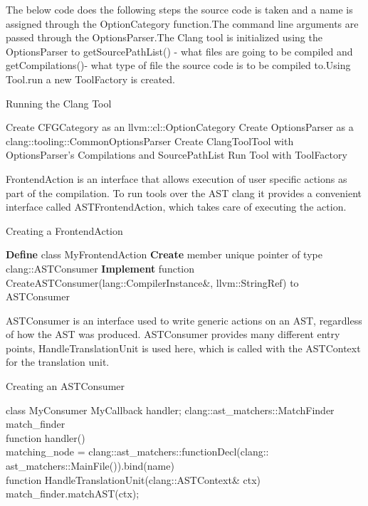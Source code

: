 The below code does the following steps the source code is taken and a name is assigned through the OptionCategory function.The command line arguments are passed through the OptionsParser.The Clang tool is initialized using the OptionsParser to getSourcePathList() - what files are going to be compiled and getCompilations()- what type of file the source code is to be compiled to.Using Tool.run a new ToolFactory is created.
\begin{algorithm}
\caption{Running the Clang Tool}\label{alg:cap}
\begin{algorithmic}[1]
\State Create CFGCategory as an llvm::cl::OptionCategory
\State Create OptionsParser as a clang::tooling::CommonOptionsParser
\State Create ClangToolTool with OptionsParser's Compilations and SourcePathList
\State Run Tool with ToolFactory
\end{algorithmic}
\end{algorithm}

\newline\newline
FrontendAction is an interface that allows execution of user specific actions as part of the compilation. To run tools over the AST clang it provides a convenient interface called ASTFrontendAction, which takes care of executing the action. 
\begin{algorithm}
\caption{Creating a FrontendAction}\label{alg:cap}
\begin{algorithmic}[1]
\State \textbf{Define} class MyFrontendAction
\State \textbf{Create} member unique pointer of type clang::ASTConsumer
\State \textbf{Implement} function CreateASTConsumer(lang::CompilerInstance\&, llvm::StringRef) to \Return ASTConsumer
\end{algorithmic}
\end{algorithm}

ASTConsumer is an interface used to write generic actions on an AST, regardless of how the AST was produced. ASTConsumer provides many different entry points, HandleTranslationUnit is used here, which is called with the ASTContext for the translation unit.

\begin{algorithm}
\caption{Creating an ASTConsumer}\label{alg:cap}
\begin{algorithmic}[1]
\State class MyConsumer
\State \qquad MyCallback handler;  
\State \qquad clang::ast\_matchers::MatchFinder match\_finder
 \\ \qquad function handler()\\
\qquad\qquad matching\_node = clang::ast\_matchers::functionDecl(clang:: \\ \qquad\qquad ast\_matchers::MainFile()).bind(name)
\\ \qquad function HandleTranslationUnit(clang::ASTContext& ctx)\\
			\qquad\qquad match\_finder.matchAST(ctx);

\end{algorithmic}
\end{algorithm}

